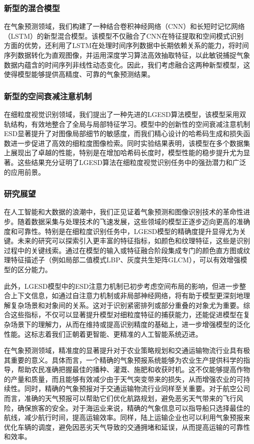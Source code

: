 \subsubsection{新型的混合模型}

在气象预测领域，我们构建了一种结合卷积神经网络（CNN）和长短时记忆网络（LSTM）的新型混合模型。该模型不仅融合了CNN在特征提取和空间模式识别方面的优势，还利用了LSTM在处理时间序列数据中长期依赖关系的能力，将时间序列数据转化为直观图像，并运用深度学习算法高效抽取特征，以此敏锐捕捉气象数据内蕴含的时间序列非线性动态变化。因此，我们考虑融合这两种新型模型，这使得模型能够提供高精度、可靠的气象预测结果。

\subsubsection{新型的空间衰减注意机制}

在细粒度视觉识别领域，我们提出了一种先进的LGESD算法模型，该模型采用双轨结构，有效地整合了全局与局部特征学习。模型中的创新性的空间衰减注意机制ESD显著提升了对图像局部细节的敏感度，而我们精心设计的哈希码生成和损失函数进一步促进了高效的细粒度图像检索。同时实验结果表明，该模型在多个数据集上展现出了卓越的性能，特别是在增加哈希码长度时，模型性能的稳步提升尤为显著。这些结果充分证明了LGESD算法在细粒度视觉识别任务中的强劲潜力和广泛的应用前景。

\subsubsection{研究展望}

在人工智能和大数据的浪潮中，我们正见证着气象预测和图像识别技术的革命性进步。随着数据采集与处理技术的飞速发展，这些领域的模型正逐步迈向更高的准确度和可靠性。特别是在细粒度识别任务中，LGESD模型的精确度提升显得尤为关键。未来的研究可以探索引入更丰富的特征指标，如颜色和纹理特征，这些是识别过程中的关键线索。通过在模型的输入或特征融合阶段集成专门的颜色直方图或纹理特征描述子（例如局部二值模式LBP、灰度共生矩阵GLCM），可以有效增强模型的区分能力。

此外，LGESD模型中的ESD注意力机制已初步考虑空间布局的影响，但进一步整合上下文信息，如通过自注意力机制或非局部神经网络，将有助于模型更深刻地理解复杂场景和对象间的关系。这对于识别紧密排列或部分重叠的对象尤为重要。综合这些指标，不仅可以显著提升模型对细粒度特征的捕获能力，还能促进模型在复杂场景下的理解力，从而在维持或提高识别精度的基础上，进一步增强模型的泛化性能。这标志着我们正朝着更智能、更精准的人工智能系统迈进。

在气象预测领域，精准度的显著提升对于农业策略规划和交通运输物流行业具有极其重要的意义。具体而言，一个精确的气象预报系统能够为农业生产提供科学的指导，帮助农民准确把握最佳的播种、灌溉、施肥和收获时机。这不仅能够提高作物的产量和质量，而且能够有效减少由于天气突变带来的损失，从而增强农业的可持续性。同时，精确的气象预报对于交通运输物流行业同样至关重要。对于航空公司而言，准确的天气预报可以帮助它们优化航路规划，避免恶劣天气带来的飞行风险，确保旅客的安全。对于海运业来说，精确的气象信息可以指导船只选择最佳的航线，减少航行时间，提高运输效率。同样，陆上运输企业也可以利用气象预报来优化车辆的调度，避免因恶劣天气导致的交通拥堵和延误，从而提高运输的可靠性和效率。

